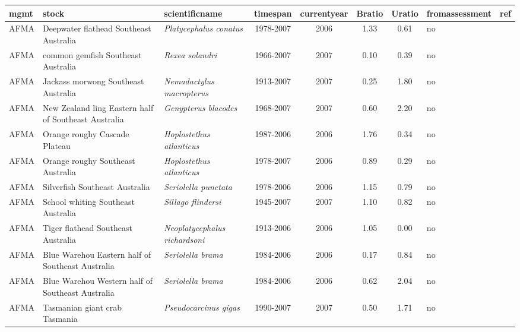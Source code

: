 \begin{longtable}{p{1.8cm}p{4cm}p{4cm}ccccp{1.9cm}c}
  \hline
mgmt & stock & scientificname & timespan & currentyear & Bratio & Uratio & fromassessment & ref \\ 
  \hline
AFMA & Deepwater flathead Southeast Australia & \textit{Platycephalus conatus} & 1978-2007 & 2006 & 1.33 & 0.61 & no & \cite{CSIRO-DEEPFLATHEADSE-1978-2007-FULTON} \\ 
  AFMA & common gemfish Southeast Australia & \textit{Rexea solandri} & 1966-2007 & 2007 & 0.10 & 0.39 & no & \cite{CSIRO-GEMFISHSE-1966-2007-FULTON} \\ 
  AFMA & Jackass morwong Southeast Australia & \textit{Nemadactylus macropterus} & 1913-2007 & 2007 & 0.25 & 1.80 & no & \cite{CSIRO-MORWONGSE-1913-2007-FULTON} \\ 
  AFMA & New Zealand ling Eastern half of Southeast Australia & \textit{Genypterus blacodes} & 1968-2007 & 2007 & 0.60 & 2.20 & no & \cite{CSIRO-NZLINGESE-1968-2007-FULTON} \\ 
  AFMA & Orange roughy Cascade Plateau & \textit{Hoplostethus atlanticus} & 1987-2006 & 2006 & 1.76 & 0.34 & no & \cite{CSIRO-OROUGHYCASCADE-1987-2006-FULTON} \\ 
  AFMA & Orange roughy Southeast Australia & \textit{Hoplostethus atlanticus} & 1978-2007 & 2006 & 0.89 & 0.29 & no & \cite{CSIRO-OROUGHYSE-1978-2007-FULTON} \\ 
  AFMA & Silverfish Southeast Australia & \textit{Seriolella punctata} & 1978-2006 & 2006 & 1.15 & 0.79 & no & \cite{CSIRO-SILVERFISHSE-1978-2006-FULTON} \\ 
  AFMA & School whiting Southeast Australia & \textit{Sillago flindersi} & 1945-2007 & 2007 & 1.10 & 0.82 & no & \cite{CSIRO-SWHITSE-1945-2007-FULTON} \\ 
  AFMA & Tiger flathead Southeast Australia & \textit{Neoplatycephalus richardsoni} & 1913-2006 & 2006 & 1.05 & 0.00 & no & \cite{CSIRO-TIGERFLATSE-1913-2006-FULTON} \\ 
  AFMA & Blue Warehou Eastern half of Southeast Australia & \textit{Seriolella brama} & 1984-2006 & 2006 & 0.17 & 0.84 & no & \cite{CSIRO-WAREHOUESE-1984-2006-FULTON} \\ 
  AFMA & Blue Warehou Western half of Southeast Australia & \textit{Seriolella brama} & 1984-2006 & 2006 & 0.62 & 2.04 & no & \cite{CSIRO-WAREHOUWSE-1984-2006-FULTON} \\ 
  AFMA & Tasmanian giant crab Tasmania & \textit{Pseudocarcinus gigas} & 1990-2007 & 2007 & 0.50 & 1.71 & no & \cite{TAFI-TASGIANTCRABTAS-1990-2007-JENSEN} \\ 

\end{longtable}
